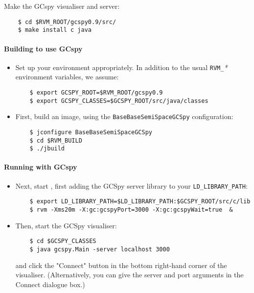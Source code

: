    Make the GCspy visualiser and server:

\begin{verbatim}
    $ cd $RVM_ROOT/gcspy0.9/src/
    $ make install c java
\end{verbatim}

\paragraph{Building \jrvm{} to use GCspy}

\begin{itemize}
  \item  Set up your environment appropriately.  In addition to the
    usual \texttt{RVM\_}\textit{*} environment variables, we assume:
   
\begin{verbatim}
    $ export GCSPY_ROOT=$RVM_ROOT/gcspy0.9
    $ export GCSPY_CLASSES=$GCSPY_ROOT/src/java/classes
\end{verbatim}

  \item First, build an image, using the
    \texttt{BaseBaseSemiSpaceGCSpy} configuration: 
\begin{verbatim}
    $ jconfigure BaseBaseSemiSpaceGCSpy
    $ cd $RVM_BUILD
    $ ./jbuild
\end{verbatim}
\end{itemize}

\paragraph{Running \jrvm{} with GCspy}

\begin{itemize}
   \item  Next, start \jrvm{}, first adding the GCSpy server library to your {\tt LD\_LIBRARY\_PATH}:
\begin{verbatim}
    $ export LD_LIBRARY_PATH=$LD_LIBRARY_PATH:$GCSPY_ROOT/src/c/lib
    $ rvm -Xms20m -X:gc:gcspyPort=3000 -X:gc:gcspyWait=true  &
\end{verbatim}

   \item Then, start the GCSpy visualiser:

\begin{verbatim}
    $ cd $GCSPY_CLASSES
    $ java gcspy.Main -server localhost 3000
\end{verbatim}

      and click the "Connect" button in the bottom right-hand corner
      of the visualiser.  (Alternatively, you can give the server and
      port arguments in the Connect dialogue box.)  

\end{itemize}


